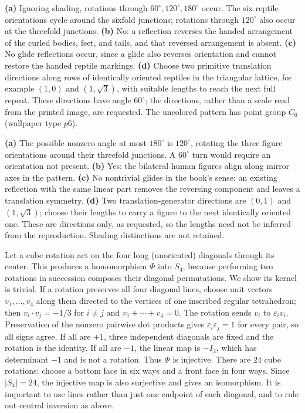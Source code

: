 \textbf{(a)} Ignoring shading, rotations through $60^\circ,120^\circ,180^\circ$ occur. The six reptile orientations cycle around the sixfold junctions; rotations through $120^\circ$ also occur at the threefold junctions. \textbf{(b)} No: a reflection reverses the handed arrangement of the curled bodies, feet, and tails, and that reversed arrangement is absent. \textbf{(c)} No glide reflections occur, since a glide also reverses orientation and cannot restore the handed reptile markings. \textbf{(d)} Choose two primitive translation directions along rows of identically oriented reptiles in the triangular lattice, for example $(1,0)$ and $(1,\sqrt3)$, with suitable lengths to reach the next full repeat. These directions have angle $60^\circ$; the directions, rather than a scale read from the printed image, are requested. The uncolored pattern has point group $C_6$ (wallpaper type $p6$).

\textbf{(a)} The possible nonzero angle at most $180^\circ$ is $120^\circ$, rotating the three figure orientations around their threefold junctions. A $60^\circ$ turn would require an orientation not present. \textbf{(b)} Yes: the bilateral human figures align along mirror axes in the pattern. \textbf{(c)} No nontrivial glides in the book's sense; an existing reflection with the same linear part removes the reversing component and leaves a translation symmetry. \textbf{(d)} Two translation-generator directions are $(0,1)$ and $(1,\sqrt3)$; choose their lengths to carry a figure to the next identically oriented one. These are directions only, as requested, so the lengths need not be inferred from the reproduction. Shading distinctions are not retained.

\idea Let a cube rotation act on the four long (unoriented) diagonals through its center.
This produces a homomorphism $\Phi$ into $S_4$, because performing two rotations in succession composes their diagonal permutations. We show its kernel is trivial. If a rotation preserves all four diagonal lines, choose unit vectors $v_1,\ldots,v_4$ along them directed to the vertices of one inscribed regular tetrahedron; then $v_i\cdot v_j=-1/3$ for $i\ne j$ and $v_1+\cdots+v_4=0$. The rotation sends $v_i$ to $\varepsilon_i v_i$. Preservation of the nonzero pairwise dot products gives $\varepsilon_i\varepsilon_j=1$ for every pair, so all signs agree. If all are $+1$, three independent diagonals are fixed and the rotation is the identity. If all are $-1$, the linear map is $-I_3$, which has determinant $-1$ and is not a rotation. Thus $\Phi$ is injective.
There are $24$ cube rotations: choose a bottom face in six ways and a front face in four ways. Since $|S_4|=24$, the injective map is also surjective and gives an isomorphism. It is important to use lines rather than just one endpoint of each diagonal, and to rule out central inversion as above.
